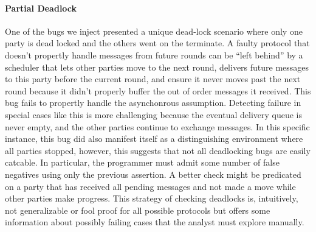 \paragraph{Partial Deadlock} 
One of the bugs we inject presented a unique dead-lock scenario where only one party is dead locked and the others went on the terminate.
A faulty protocol that doesn't propertly handle messages from future rounds can be ``left behind'' by a scheduler that lets other parties move to the next round, delivers future messages to this party before the current round, and ensure it never moves past the next round because it didn't properly buffer the out of order messages it received. 
This bug fails to propertly handle the asynchonrous assumption.
Detecting failure in special cases like this is more challenging because the eventual delivery queue is never empty, and the other parties continue to exchange messages.
In this specific instance, this bug did also manifest itself as a distinguishing environment where all parties stopped, however, this suggests that not all deadlocking bugs are easily catcable.
In particular, the programmer must admit some number of false negatives using only the previous assertion.
A better check might be predicated on a party that has received all pending messages and not made a move while other parties make progress. 
This strategy of checking deadlocks is, intuitively, not generalizable or fool proof for all possible protocols but offers some information about possibly failing cases that the analyst must explore manually.


